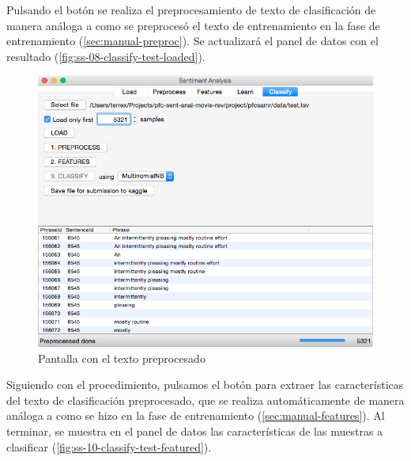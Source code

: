 \newpage
Pulsando el botón  se realiza el preprocesamiento de texto de clasificación de manera análoga a como se preprocesó el texto de entrenamiento en la fase de entrenamiento (\autoref{sec:manual-preproc}). Se actualizará el panel de datos con el resultado (\autoref{fig:ss-08-classify-test-loaded}).

\begin{figure}[H]
\centering
\includegraphics[width=14cm]{ss-09-classify-test-preproccesed}
\caption{Pantalla con el texto preprocesado}
\label{fig:ss-09-classify-test-preproccesed}
\end{figure}

\newpage
Siguiendo con el procedimiento, pulsamos el botón  para extraer las características del texto de clasificación preprocesado, que se realiza automáticamente de manera análoga a como se hizo en la fase de entrenamiento (\autoref{sec:manual-features}). Al terminar, se muestra en el panel de datos las características de las muestras a clasificar (\autoref{fig:ss-10-classify-test-featured}).

